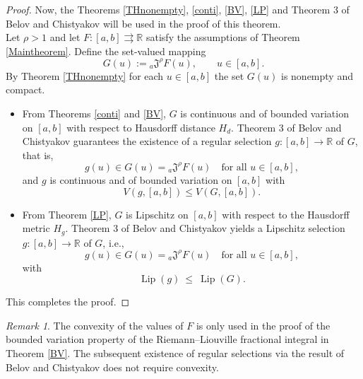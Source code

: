 \documentclass[a4paper,12pt,reqno]{amsart}
\numberwithin{equation}{section}
\theoremstyle{definition}
\theoremstyle{remark}
\newtheorem{remark}[theorem]{Remark}
\numberwithin{equation}{section}
\begin{document}
\begin{proof} Now, the Theorems \ref{THnonempty}, \ref{conti}, \ref{BV}, \ref{LP} and Theorem 3 of
Belov and Chistyakov \cite{SAVV} will be used in the proof of this theorem.\\
Let $\rho>1$ and let $F:[a,b]\rightrightarrows\mathbb{R}$ satisfy the assumptions of Theorem \ref{Maintheorem}.  Define the set-valued mapping
$$G(u):={}_{a}\mathfrak{J}^{\rho}F(u), \qquad u\in[a,b].$$ By Theorem \ref{THnonempty} for each $u\in[a,b]$ the set $G(u)$ is nonempty and  compact. 
\begin{itemize}
    \item[(a)] From Theorems \ref{conti} and \ref{BV}, $G$ is continuous and of bounded variation on $[a,b]$ with respect to Hausdorff distance $H_d$. Theorem 3 of Belov and Chistyakov \cite{SAVV} guarantees the existence of a regular selection $g:[a,b]\to\mathbb{R}$ of $G$, that is,
$$g(u)\in G(u)={}_{a}\mathfrak{J}^{\rho}F(u)
\quad\text{for all }u\in[a,b],$$
and $g$ is continuous and of bounded variation on $[a,b]$ with 
$$V(g,[a,b]) \le V(G,[a,b]).$$

    \item[(b)] From Theorem \ref{LP}, $G$ is Lipschitz on $[a,b]$ with respect to the Hausdorff metric $H_g$.  Theorem 3 of Belov and Chistyakov \cite{SAVV} yields a 
Lipschitz selection $g:[a,b]\to\mathbb{R}$ of $G$, i.e.,
$$g(u)\in G(u)={}_{a}\mathfrak{J}^{\rho}F(u)
\quad\text{for all }u\in[a,b],$$
 with
$$\operatorname{Lip}(g)\ \le\ \operatorname{Lip}(G).$$
\end{itemize}
This completes the proof.
\end{proof}
\begin{remark}
The convexity of the values of $F$ is only used in the proof of the bounded variation property of the Riemann–Liouville fractional integral in Theorem \ref{BV}. The subsequent existence of regular selections via the result of Belov and Chistyakov \cite{SAVV} does not require convexity.
\end{remark}
\end{document}

